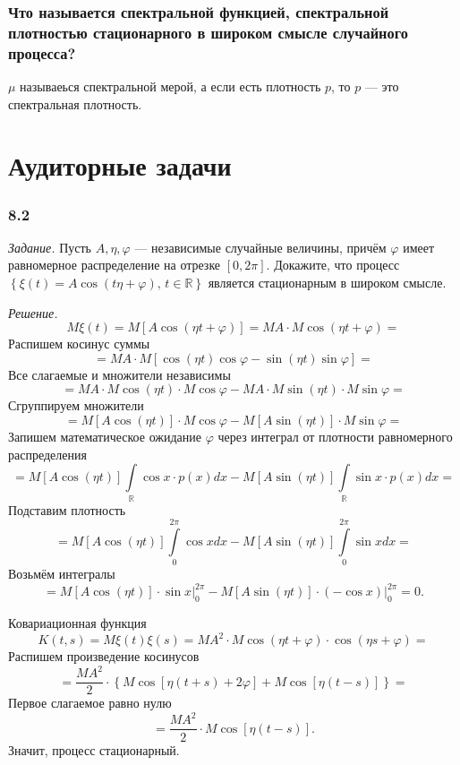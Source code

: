 \subsubsection*{Что называется спектральной функцией, спектральной плотностью стационарного в
                широком смысле случайного процесса?}

$ \mu $ называеься спектральной мерой, а если есть плотность $p$, то $p$ ---
это спектральная плотность.

\section*{Аудиторные задачи}

\subsubsection*{8.2}

\textit{Задание.}
Пусть $A, \eta, \varphi $ --- независимые случайные величины,
причём $ \varphi $ имеет равномерное распределение на отрезке $ \left[ 0, 2 \pi \right] $.
Докажите, что процесс
$ \left\{
    \xi \left( t \right) = A \cos \left( t \eta + \varphi \right), \, t \in \mathbb{R}
  \right\} $
является стационарным в широком смысле.

\textit{Решение.}
$$M \xi \left( t \right) =
  M \left[ A \cos \left( \eta t + \varphi \right) \right] =
  MA \cdot M \cos \left( \eta t + \varphi \right) =$$
Распишем косинус суммы
$$= MA \cdot M \left[
    \cos \left( \eta t \right) \cos \varphi - \sin \left( \eta t \right) \sin \varphi \right] =$$
Все слагаемые и множители независимы
$$= MA \cdot M \cos \left( \eta t \right) \cdot M \cos \varphi -
  MA \cdot M \sin \left( \eta t \right) \cdot M \sin \varphi =$$
Сгруппируем множители
$$= M \left[ A \cos \left( \eta t \right) \right] \cdot M \cos \varphi -
  M \left[ A \sin \left( \eta t \right) \right] \cdot M \sin \varphi =$$
Запишем математическое ожидание $ \varphi $ через интеграл от плотности равномерного распределения
$$= M \left[ A \cos \left( \eta t \right) \right]
  \int \limits_{ \mathbb{R}} \cos x \cdot p \left( x \right) dx -
  M \left[ A \sin \left( \eta t \right) \right]
  \int \limits_{ \mathbb{R}} \sin x \cdot p \left( x \right) dx =$$
Подставим плотность
$$= M \left[ A \cos \left( \eta t \right) \right] \int \limits_0^{2 \pi } \cos xdx -
  M \left[ A \sin \left( \eta t \right) \right] \int \limits_0^{2 \pi } \sin xdx =$$
Возьмём интегралы
$$= M \left[ A \cos \left( \eta t \right) \right] \cdot \left. \sin x \right|_0^{2 \pi } -
  M \left[ A \sin \left( \eta t \right) \right] \cdot
  \left. \left( - \cos x \right) \right|_0^{2 \pi } =
  0.$$

Ковариационная функция
$$K \left( t, s \right) =
  M \xi \left( t \right) \xi \left( s \right) =
  M A^2 \cdot M \cos \left( \eta t + \varphi \right) \cdot \cos \left( \eta s + \varphi \right) =$$
Распишем произведение косинусов
$$= \frac{MA^2}{2} \cdot \left\{
  M \cos \left[ \eta \left( t + s \right) + 2 \varphi \right] +
  M \cos \left[ \eta \left( t - s \right) \right] \right\} =$$
Первое слагаемое равно нулю
$$= \frac{MA^2}{2} \cdot M \cos \left[ \eta \left( t - s \right) \right].$$
Значит, процесс стационарный.
